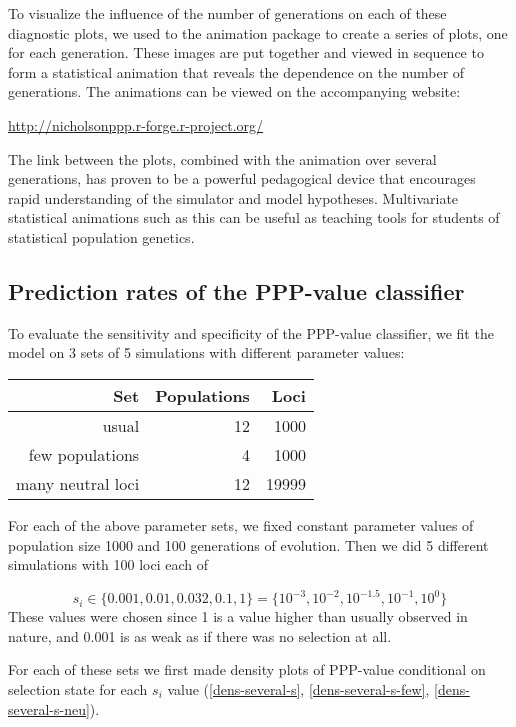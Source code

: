 \documentclass[a4paper,12pt]{article}
\begin{document}
To visualize the influence of the number of generations on each of
these diagnostic plots, we used to the animation
package \cite{animation} to create a series of plots, one for each
generation. These images are put together and viewed in sequence to
form a statistical animation that reveals the dependence on the number
of generations. The animations can be viewed on the accompanying
website:

\url{http://nicholsonppp.r-forge.r-project.org/}

The link between the plots, combined with the animation over several
generations, has proven to be a powerful pedagogical device that
encourages rapid understanding of the simulator and model
hypotheses. Multivariate statistical animations such as this can be
useful as teaching tools for students of statistical population
genetics.

\subsection{Prediction rates of the PPP-value classifier}

To evaluate the sensitivity and specificity of the PPP-value
classifier, we fit the model on 3 sets of 5 simulations with different
parameter values:

\begin{center}
\begin{tabular}{rrr}
  Set & Populations & Loci \\
  \hline
  usual & 12 & 1000 \\ %
  few populations & 4 & 1000\\   %
  many neutral loci & 12 & 19999   %
\end{tabular}
\end{center}

For each of the above parameter sets, we fixed constant parameter
values of population size 1000 and 100 generations of evolution. Then
we did 5 different simulations with 100 loci each of

$$
s_i\in\{0.001,0.01,0.032,0.1,1\}=\{10^{-3},10^{-2},10^{-1.5},10^{-1},10^0\}
$$
These values were chosen since 1 is a value higher than usually
observed in nature, and 0.001 is as weak as if there was no selection
at all.

For each of these sets we first made density plots of PPP-value
conditional on selection state for each $s_i$ value
(\autoref{dens-several-s}, \autoref{dens-several-s-few},
\autoref{dens-several-s-neu}).
\end{document}
